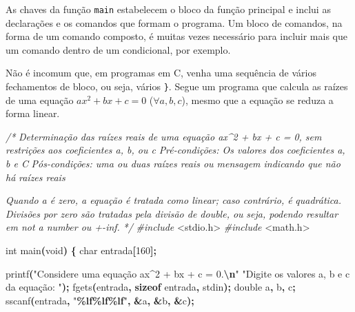 \documentclass[
  11pt,
  a4paper,
]{scrbook}
\newenvironment{Shaded}{\begin{snugshade}}{\end{snugshade}}
\newcommand{\CommentTok}[1]{\textcolor[rgb]{0.56,0.35,0.01}{\textit{#1}}}
\newcommand{\DataTypeTok}[1]{\textcolor[rgb]{0.13,0.29,0.53}{#1}}
\newcommand{\DecValTok}[1]{\textcolor[rgb]{0.00,0.00,0.81}{#1}}
\newcommand{\ImportTok}[1]{#1}
\newcommand{\KeywordTok}[1]{\textcolor[rgb]{0.13,0.29,0.53}{\textbf{#1}}}
\newcommand{\NormalTok}[1]{#1}
\newcommand{\OperatorTok}[1]{\textcolor[rgb]{0.81,0.36,0.00}{\textbf{#1}}}
\newcommand{\PreprocessorTok}[1]{\textcolor[rgb]{0.56,0.35,0.01}{\textit{#1}}}
\newcommand{\SpecialCharTok}[1]{\textcolor[rgb]{0.81,0.36,0.00}{\textbf{#1}}}
\newcommand{\StringTok}[1]{\textcolor[rgb]{0.31,0.60,0.02}{#1}}
\begin{document}
As chaves da função \texttt{main} estabelecem o bloco da função
principal e inclui as declarações e os comandos que formam o programa.
Um bloco de comandos, na forma de um comando composto, é muitas vezes
necessário para incluir mais que um comando dentro de um condicional,
por exemplo.

Não é incomum que, em programas em C, venha uma sequência de vários
fechamentos de bloco, ou seja, vários \texttt{\}}. Segue um programa que
calcula as raízes de uma equação \({ax^2 + bx + c = 0}\)
(\({\forall a, b, c}\)), mesmo que a equação se reduza a forma linear.

\begin{Shaded}
\begin{Highlighting}[]
\CommentTok{/*}
\CommentTok{Determinação das raízes reais de uma equação ax\^{}2 + bx + c = 0, sem restrições}
\CommentTok{    aos coeficientes a, b, ou c}
\CommentTok{Pré{-}condições: Os valores dos coeficientes a, b e C}
\CommentTok{Pós{-}condições: uma ou duas raízes reais ou mensagem indicando que não há}
\CommentTok{    raízes reais}

\CommentTok{Quando a é zero, a equação é tratada como linear; caso contrário, é}
\CommentTok{quadrática. Divisões por zero são tratadas pela divisão de double, ou}
\CommentTok{seja, podendo resultar em \textquotesingle{}not a number\textquotesingle{} ou +{-}inf.}
\CommentTok{*/}
\PreprocessorTok{\#include }\ImportTok{\textless{}stdio.h\textgreater{}}
\PreprocessorTok{\#include }\ImportTok{\textless{}math.h\textgreater{}}

\DataTypeTok{int}\NormalTok{ main}\OperatorTok{(}\DataTypeTok{void}\OperatorTok{)} \OperatorTok{\{}
    \DataTypeTok{char}\NormalTok{ entrada}\OperatorTok{[}\DecValTok{160}\OperatorTok{];}

\NormalTok{    printf}\OperatorTok{(}\StringTok{"Considere uma equação ax\^{}2 + bx + c = 0.}\SpecialCharTok{\textbackslash{}n}\StringTok{"}
           \StringTok{"Digite os valores a, b e c da equação: "}\OperatorTok{);}
\NormalTok{    fgets}\OperatorTok{(}\NormalTok{entrada}\OperatorTok{,} \KeywordTok{sizeof}\NormalTok{ entrada}\OperatorTok{,}\NormalTok{ stdin}\OperatorTok{);}
    \DataTypeTok{double}\NormalTok{ a}\OperatorTok{,}\NormalTok{ b}\OperatorTok{,}\NormalTok{ c}\OperatorTok{;}
\NormalTok{    sscanf}\OperatorTok{(}\NormalTok{entrada}\OperatorTok{,} \StringTok{"}\SpecialCharTok{\%lf\%lf\%lf}\StringTok{"}\OperatorTok{,} \OperatorTok{\&}\NormalTok{a}\OperatorTok{,} \OperatorTok{\&}\NormalTok{b}\OperatorTok{,} \OperatorTok{\&}\NormalTok{c}\OperatorTok{);}


\end{Highlighting}
\end{Shaded}
\end{document}
